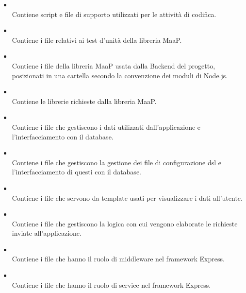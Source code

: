 \begin{itemize}
 \item \textbf{} \\
	Contiene script e file di supporto utilizzati per le attività di codifica.

 \item \textbf{} \\
	Contiene i file relativi ai test d'unità della libreria MaaP.

 \item \textbf{} \\
	Contiene i file della libreria MaaP usata dalla Backend del progetto, posizionati in una cartella  secondo la convenzione dei moduli di Node.js.

 \item \textbf{} \\
	Contiene le librerie richieste dalla libreria MaaP.

 \item \textbf{} \\
	Contiene i file che gestiscono i dati utilizzati dall'applicazione e l'interfacciamento con il database.

 \item \textbf{} \\
	Contiene i file che gestiscono la gestione dei file di configurazione dsl e l'interfacciamento di questi con il database.

 \item \textbf{} \\
	Contiene i file che servono da template usati per visualizzare i dati all'utente.

 \item \textbf{} \\
	Contiene i file che gestiscono la logica con cui vengono elaborate le richieste inviate all'applicazione.

 \item \textbf{} \\
	Contiene i file che hanno il ruolo di middleware nel framework Express.

 \item \textbf{} \\
	Contiene i file che hanno il ruolo di service nel framework Express.


\end{itemize}
